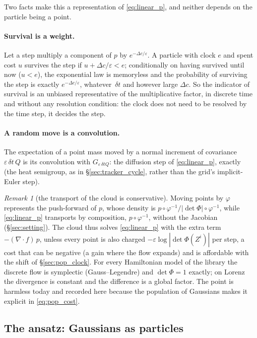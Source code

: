 \documentclass[11pt,a4paper]{article}
\newcommand{\eps}{\varepsilon}
\newcommand{\abs}[1]{\left\lvert #1 \right\rvert}
\newcommand{\grad}{\nabla}
\newcommand{\dt}{\,\delta t}
\theoremstyle{plain}
\theoremstyle{definition}
\theoremstyle{remark}
\newtheorem{remark}{Remark}
\begin{document}
Two facts make this a representation of \eqref{eq:linear_p}, and neither depends on the particle being a point.

\paragraph{Survival is a weight.}
Let a step multiply a component of $p$ by $e^{-\Delta c/\eps}$. A particle with clock $e$ and spent cost $u$ survives the step if $u+\Delta c/\eps<e$; conditionally on having survived until now ($u<e$), the exponential law is memoryless and the probability of surviving the step is exactly $e^{-\Delta c/\eps}$, whatever $\dt$ and however large $\Delta c$. So the indicator of survival is an unbiased representative of the multiplicative factor, in discrete time and without any resolution condition: the clock does not need to be resolved by the time step, it decides the step.

\paragraph{A random move is a convolution.}
The expectation of a point mass moved by a normal increment of covariance $\eps\dt\,Q$ is its convolution with $G_{\eps\dt Q}$: the diffusion step of \eqref{eq:linear_p}, exactly (the heat semigroup, as in \S\ref{sec:tracker_cycle}, rather than the grid's implicit-Euler step).

\begin{remark}[the transport of the cloud is conservative]
Moving points by $\varphi$ represents the push-forward of $p$, whose density is $p\circ\varphi^{-1}/\abs{\det\Phi}\circ\varphi^{-1}$, while \eqref{eq:linear_p} transports by composition, $p\circ\varphi^{-1}$, without the Jacobian (\S\ref{sec:setting}). The cloud thus solves \eqref{eq:linear_p} with the extra term $-(\grad\!\cdot\!f)\,p$, unless every point is also charged $-\eps\log\abs{\det\Phi(Z^i)}$ per step, a cost that can be negative (a gain where the flow expands) and is affordable with the shift of \S\ref{sec:pop_clock}. For every Hamiltonian model of the library the discrete flow is symplectic (Gauss--Legendre) and $\det\Phi=1$ exactly; on Lorenz the divergence is constant and the difference is a global factor. The point is harmless today and recorded here because the population of Gaussians makes it explicit in \eqref{eq:pop_cost}.
\end{remark}

\subsection{The ansatz: Gaussians as particles}
\label{sec:pop_ansatz}
\end{document}
